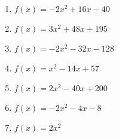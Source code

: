 \documentclass{article}%
\begin{document}
\begin{enumerate}[label=\alph*)]
\item%
\newline\vspace{0.5cm} $f(x)=-2x^2 + 16x - 40$%
\item%
\newline\vspace{0.5cm} $f(x)=3x^2 + 48x + 195$%
\item%
\newline\vspace{0.5cm} $f(x)=-2x^2 - 32x - 128$%
\item%
\newline\vspace{0.5cm} $f(x)=x^2 - 14x + 57$%
\item%
\newline\vspace{0.5cm} $f(x)=2x^2 - 40x + 200$%
\item%
\newline\vspace{0.5cm} $f(x)=-2x^2 - 4x - 8$%
\item%
\newline\vspace{0.5cm} $f(x)=2x^2$%
\end{enumerate}

%
\end{document}
